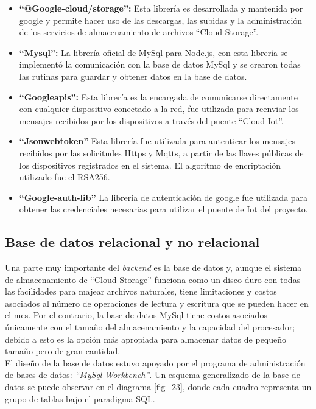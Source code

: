 \begin{itemize}
	
	\item \textbf{``@Google-cloud/storage'':} Esta librería es desarrollada y mantenida por google y permite hacer uso de las descargas, las subidas y la administración de los servicios de almacenamiento de archivos ``Cloud Storage''.
	
	\item \textbf{``Mysql'':} La librería oficial de MySql para Node.js, con esta librería se implementó la comunicación con la base de datos MySql y se crearon todas las rutinas para guardar y obtener datos en la base de datos.
	
	\item \textbf{``Googleapis'':} Esta librería es la encargada de comunicarse directamente con cualquier dispositivo conectado a la red, fue utilizada para reenviar los mensajes recibidos por los dispositivos a través del puente ``Cloud Iot''.
	
	\item  \textbf{``Jsonwebtoken''} Esta librería fue utilizada para autenticar los mensajes recibidos por las solicitudes Https y Mqtts, a partir de las llaves públicas de los dispositivos registrados en el sistema. El algoritmo de encriptación utilizado fue el RSA256.
	
	\item  \textbf{``Google-auth-lib''} La librería de autenticación de google fue utilizada para obtener las credenciales necesarias para utilizar el puente de Iot del proyecto.
	
\end{itemize}


\subsection{Base de datos relacional y no relacional}

Una parte muy importante del \textit{backend} es la base de datos y, aunque el sistema de almacenamiento de ``Cloud Storage'' funciona como un disco duro con todas las facilidades para majear archivos naturales, tiene limitaciones y costos asociados al número de operaciones de lectura y escritura que se pueden hacer en el mes. Por el contrario, la base de datos MySql tiene costos asociados únicamente con el tamaño del almacenamiento y la capacidad del procesador; debido a esto es la opción más apropiada para almacenar datos de pequeño tamaño pero de gran cantidad.
\vspace{0.5cm}\\
El diseño de la base de datos estuvo apoyado por el programa de administración de bases de datos: \textsl{``MySql Workbench''}. Un esquema generalizado de la base de datos se puede observar en el diagrama \ref{fig_23}, donde cada cuadro representa un grupo de tablas bajo el paradigma SQL. 
\vspace{0.5cm}\\

